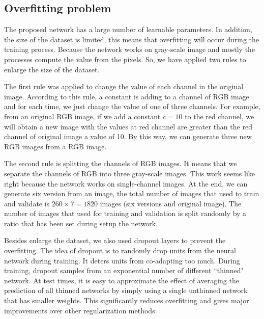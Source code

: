 \documentclass[conference]{IEEEtran}
\begin{document}
\subsection{Overfitting problem}
The proposed network has a large number of learnable parameters. In addition, the size of the dataset is limited, this means that overfitting will occur during the training process. Because the network works on  gray-scale image and mostly the processes compute the value from the pixels. So, we have applied two rules to enlarge the size of the dataset.

The first rule was applied to change the value of each channel in the original image. According to this rule, a constant is adding to a channel of RGB image and for each time, we just change the value of one of three channels. For example, from an original RGB image, if we add a constant $c = 10$ to the red channel, we will obtain a new image with the values at red channel are greater than the red channel of original image a value of 10. By this way, we can generate three new RGB images from a RGB image.

The second rule is splitting the channels of RGB images. It means that we separate the channels of RGB into three gray-scale images. This work seems like right because the network works on single-channel images. At the end, we can generate six version from an image, the total number of images that used to train and validate is $260 \times 7 = 1820$ images (six versions and original image). The number of images that used for training and validation is split randomly by a ratio that has been set during setup the network.

Besides enlarge the dataset, we also used dropout layers to prevent the overfitting. The idea of dropout is to randomly drop units from the neural network during training. It deters units from co-adapting too much. During training, dropout samples from an exponential number of different ``thinned" network. At test times, it is easy to approximate the effect of averaging the prediction of all thinned networks by simply using a single unthinned network that has smaller weights. This significantly reduces overfitting and gives major improvements over other regularization methods\cite{srivastava2014dropout}.
\end{document}
